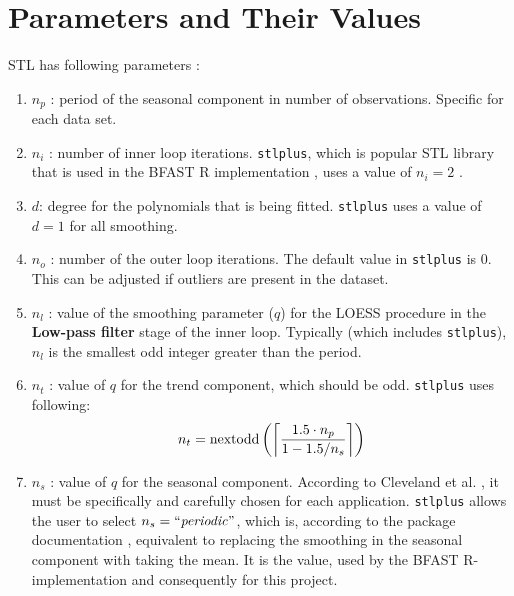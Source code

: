 \documentclass[main.tex]{subfiles}
\begin{document}
\section{Parameters and Their Values}
\label{sec:parameter_values}
STL has following parameters \cite{stl}:
\begin{enumerate}
\item $n_p$ : period of the seasonal component in number of observations.
  Specific for each data set.
\item $n_i$ : number of inner loop iterations. \texttt{stlplus}, which is
  popular STL library that is used in the BFAST R implementation \cite{bfast-github}, uses a
  value of $n_i = 2$ \cite{stlplus}.
\item $d$: degree for the polynomials that is being fitted.
  \texttt{stlplus} uses a value of $d=1$ for all smoothing.
\item $n_o$ : number of the outer loop iterations. The default value in
  \texttt{stlplus} is 0. This can be adjusted if outliers are present in the dataset.
\item $n_l$ : value of the smoothing parameter ($q$) for the LOESS procedure in the
  \textbf{Low-pass filter} stage of the inner loop. Typically (which includes
  \texttt{stlplus}), $n_l$ is the smallest odd integer greater than the period.
\item $n_t$ : value of $q$ for the trend component, which should be odd.
  \texttt{stlplus} uses following:
  \[
  n_t =\text{nextodd}\left(
  \ceil[\bigg]{
    \frac{1.5 \cdot n_p}
         {1-1.5/n_s}
  }
  \right)
  \]
\item $n_s$ : value of $q$ for the seasonal component. According to Cleveland
  et al. \cite{stl}, it must be specifically and
  carefully chosen for each application. \texttt{stlplus} allows
  the user to select $n_s = \text{``\emph{periodic}''}$, which is, according to
  the package documentation \cite{stlplus}, equivalent to replacing
  the smoothing in the seasonal component with taking the mean. It is the value,
  used by the BFAST R-implementation and consequently for this project.
\end{enumerate}
\biblio
\end{document}
